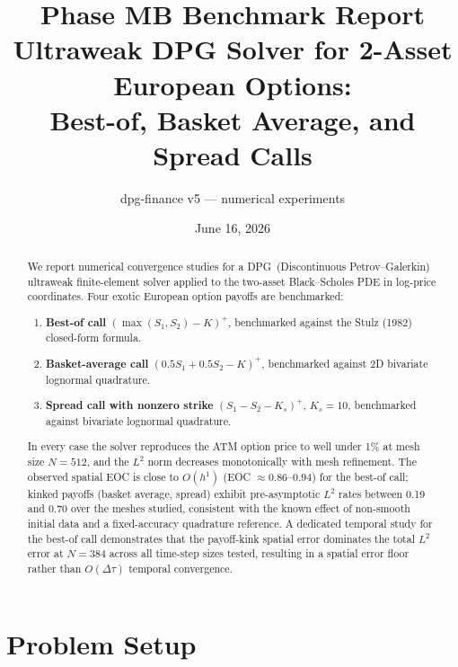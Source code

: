 \documentclass[11pt,a4paper]{article}
\newcommand{\dpg}{\textsc{DPG}}
\newcommand{\Ks}{K_s}
\begin{document}

\title{\textbf{Phase MB Benchmark Report}\\[4pt]
  \large Ultraweak DPG Solver for 2-Asset European Options:\\
  Best-of, Basket Average, and Spread Calls}
\author{dpg-finance v5 --- numerical experiments}
\date{June 16, 2026}
\maketitle

\begin{abstract}
We report numerical convergence studies for a \dpg\ (Discontinuous Petrov–Galerkin)
ultraweak finite-element solver applied to the two-asset Black–Scholes PDE in log-price
coordinates.  Four exotic European option payoffs are benchmarked:
\begin{enumerate}
  \item \textbf{Best-of call} $(\max(S_1,S_2)-K)^+$, benchmarked against the Stulz
        (1982) closed-form formula.
  \item \textbf{Basket-average call} $(0.5S_1+0.5S_2-K)^+$, benchmarked against 2D
        bivariate lognormal quadrature.
  \item \textbf{Spread call with nonzero strike} $(S_1-S_2-\Ks)^+$, $\Ks=10$,
        benchmarked against bivariate lognormal quadrature.
\end{enumerate}
In every case the solver reproduces the ATM option price to well under 1\% at mesh
size $N=512$, and the $L^2$ norm decreases monotonically with mesh refinement.
The observed spatial EOC is close to $O(h^1)$ (EOC $\approx 0.86$--$0.94$) for
the best-of call; kinked payoffs (basket average, spread) exhibit pre-asymptotic
$L^2$ rates between 0.19 and 0.70 over the meshes studied, consistent with the
known effect of non-smooth initial data and a fixed-accuracy quadrature reference.
A dedicated temporal study for the best-of call demonstrates that the payoff-kink
spatial error dominates the total $L^2$ error at $N=384$ across all time-step
sizes tested, resulting in a spatial error floor rather than $O(\Delta\tau)$
temporal convergence.
\end{abstract}

\tableofcontents
\newpage

\section{Problem Setup}
\label{sec:setup}
\end{document}
